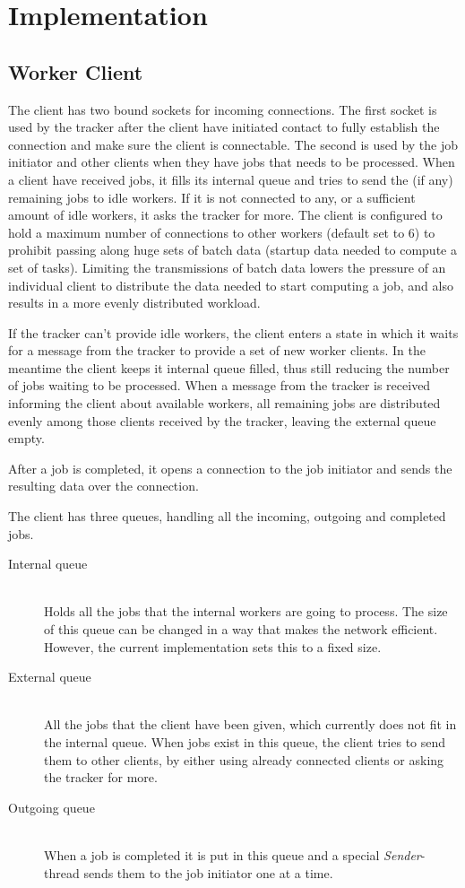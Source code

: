 \chapter{Implementation}


\section{Worker Client}
The client has two bound sockets for incoming connections. The first socket is used by the tracker after the client have initiated contact to fully establish the connection and make sure the client is connectable.
The second is used by the job initiator and other clients when they have jobs that needs to be processed.
When a client have received jobs, it fills its internal queue and tries to send the (if any) remaining jobs to idle workers.
If it is not connected to any, or a sufficient amount of idle workers, it asks the tracker for more. The client is configured to hold a maximum number of connections to other workers (default set to 6) to prohibit passing along huge sets of batch data (startup data needed to compute a set of tasks). Limiting the transmissions of batch data lowers the pressure of an individual client to distribute the data needed to start computing a job, and also results in a more evenly distributed workload.

If the tracker can't provide idle workers, the client enters a state in which it waits for a message from the tracker to provide a set of new worker clients. In the meantime the client keeps it internal queue filled, thus still reducing the number of jobs waiting to be processed. When a message from the tracker is received informing the client about available workers, all remaining jobs are distributed evenly among those clients received by the tracker, leaving the external queue empty.

After a job is completed, it opens a connection to the job initiator and sends the resulting data over the connection.

The client has three queues, handling all the incoming, outgoing and completed jobs.
\begin{description}
	\item[Internal queue] \hfill \\
	Holds all the jobs that the internal workers are going to process. The size of this queue can be changed in a way that makes the network efficient. However, the current implementation sets this to a fixed size.
	\item[External queue] \hfill \\
	All the jobs that the client have been given, which currently does not fit in the internal queue.
	When jobs exist in this queue, the client tries to send them to other clients, by either using already connected clients or asking the tracker for more.
	\item[Outgoing queue] \hfill \\
	When a job is completed it is put in this queue and a special \textit{Sender}-thread sends them to the job initiator one at a time.
\end{description}

